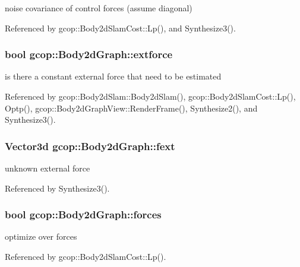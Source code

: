 noise covariance of control forces (assume diagonal) 



\-Referenced by gcop\-::\-Body2d\-Slam\-Cost\-::\-Lp(), and \-Synthesize3().

\subsubsection[{extforce}]{\setlength{\rightskip}{0pt plus 5cm}bool {\bf gcop\-::\-Body2d\-Graph\-::extforce}}\label{classgcop_1_1Body2dGraph_a9a49aab77a6e9cb8ea90591636ce23d2}


is there a constant external force that need to be estimated 



\-Referenced by gcop\-::\-Body2d\-Slam\-::\-Body2d\-Slam(), gcop\-::\-Body2d\-Slam\-Cost\-::\-Lp(), \-Optp(), gcop\-::\-Body2d\-Graph\-View\-::\-Render\-Frame(), \-Synthesize2(), and \-Synthesize3().

\subsubsection[{fext}]{\setlength{\rightskip}{0pt plus 5cm}\-Vector3d {\bf gcop\-::\-Body2d\-Graph\-::fext}}\label{classgcop_1_1Body2dGraph_a558f4776f345528ee0a90dd2d7a978d8}


unknown external force 



\-Referenced by \-Synthesize3().

\subsubsection[{forces}]{\setlength{\rightskip}{0pt plus 5cm}bool {\bf gcop\-::\-Body2d\-Graph\-::forces}}\label{classgcop_1_1Body2dGraph_a834526a54ea432358eb29b69897c1639}


optimize over forces 



\-Referenced by gcop\-::\-Body2d\-Slam\-Cost\-::\-Lp().

